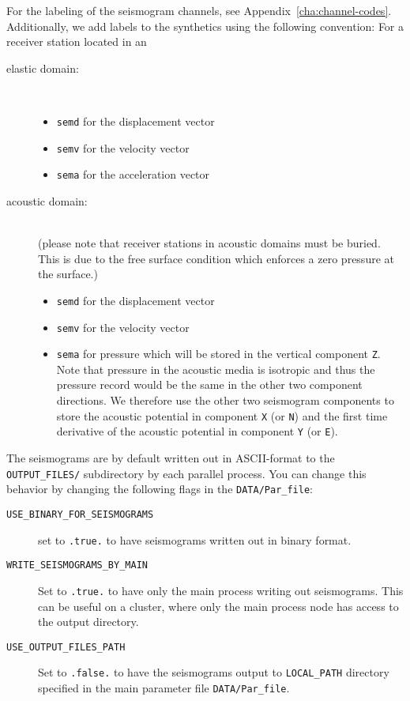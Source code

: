 For the labeling of the seismogram channels, see Appendix~\ref{cha:channel-codes}.
Additionally, we add labels to the synthetics using the following
convention: For a receiver station located in an
\begin{description}
\item [{elastic domain:}] ~
\begin{itemize}
\item \texttt{semd} for the displacement vector
\item \texttt{semv} for the velocity vector
\item \texttt{sema} for the acceleration vector
\end{itemize}
\item [{acoustic domain:}] ~\\
 (please note that receiver stations in acoustic domains must be buried.
This is due to the free surface condition which enforces a zero pressure
at the surface.)
\begin{itemize}
\item \texttt{semd} for the displacement vector
\item \texttt{semv} for the velocity vector
\item \texttt{sema} for pressure which will be stored in the vertical component
\texttt{Z}. Note that pressure in the acoustic media is isotropic
and thus the pressure record would be the same in the other two component
directions. We therefore use the other two seismogram components to
store the acoustic potential in component \texttt{X} (or \texttt{N})
and the first time derivative of the acoustic potential in component
\texttt{Y} (or \texttt{E}).
\end{itemize}
\end{description}
The seismograms are by default written out in ASCII-format to the
\texttt{OUTPUT\_FILES/} subdirectory by each parallel process. You
can change this behavior by changing the following flags in the \texttt{DATA/Par\_file}:
\begin{description}
\item [{\texttt{USE\_BINARY\_FOR\_SEISMOGRAMS}}] set to \texttt{.true.} to have seismograms
written out in binary format.
\item [{\texttt{WRITE\_SEISMOGRAMS\_BY\_MAIN}}] Set to \texttt{.true.}
to have only the main process writing out seismograms. This can
be useful on a cluster, where only the main process node has access
to the output directory.
\item [{\texttt{USE\_OUTPUT\_FILES\_PATH}}] Set to \texttt{.false.} to
have the seismograms output to \texttt{LOCAL\_PATH} directory specified
in the main parameter file \texttt{DATA/Par\_file}.
\end{description}

